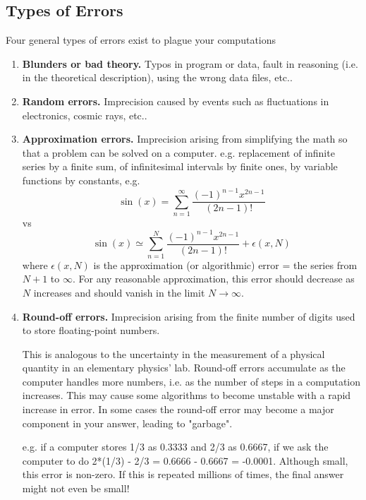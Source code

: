 \documentclass[../../../main.tex]{subfiles}
\begin{document}
\subsection{Types of Errors}

Four general types of errors exist to plague your computations
\begin{enumerate}
    \item \textbf{Blunders or bad theory.} Typos in program or data, fault in reasoning (i.e. in the theoretical description), using the wrong data files, etc..
    \item \textbf{Random errors.} Imprecision caused by events such as fluctuations in electronics, cosmic rays, etc..
    \item \textbf{Approximation errors.} Imprecision arising from simplifying the math so that a problem can be solved on a computer. e.g. replacement of infinite series by a finite sum, of infinitesimal intervals by finite ones, by variable functions by constants, e.g.
          \begin{equation*}
              \sin(x) = \sum_{n=1}^{\infty} \frac{ (-1)^{n-1} x^{2n-1} } { (2n-1)! }
          \end{equation*}
          vs
          \begin{equation*}
              \sin(x) \simeq \sum_{n=1}^{N} \frac{ (-1)^{n-1} x^{2n-1} } { (2n-1)! } + \epsilon(x,N)
          \end{equation*}
          where $\epsilon(x,N)$  is the approximation (or algorithmic) error = the series from $N+1$ to $\infty$.
          For any reasonable approximation, this error should decrease as $N$ increases and should vanish in the limit $N\rightarrow \infty$.
    \item \textbf{Round-off errors.} Imprecision arising from the finite number of digits used to store floating-point numbers.

          This is analogous to the uncertainty in the measurement of a physical quantity in an elementary physics' lab. Round-off errors accumulate as the computer handles more numbers, i.e. as the number of steps in a computation increases. This may cause some algorithms to become unstable with a rapid increase in error. In some cases the round-off error may become a major component in your answer, leading to "garbage".

          e.g. if a computer stores 1/3 as 0.3333 and 2/3 as 0.6667, if we ask the computer to do 2*(1/3) - 2/3 = 0.6666 - 0.6667 = -0.0001. Although small, this error is non-zero. If this is repeated millions of times, the final answer might not even be small!
\end{enumerate}
\end{document}
